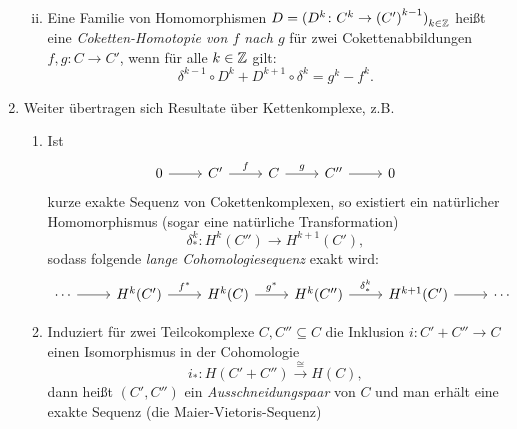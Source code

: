 \begin{kommentar}
\begin{enumerate}
\begin{enumerate}[(i)]
\begin{align*}
          \end{align*}
        \item
          Eine Familie von Homomorphismen $D = {(D^k \colon C^k \to {(C')}^{k-1})}_{k \in \mathbb{Z}}$ heißt eine \emph{Coketten-Homotopie von $f$ nach $g$} für zwei Cokettenabbildungen $f,g \colon C \to C'$, wenn für alle $k \in \mathbb{Z}$ gilt:
          \begin{equation*}
            \delta^{k-1} \circ D^k + D^{k+1} \circ \delta^k = g^k - f^k.
          \end{equation*}
      \end{enumerate}
    \item
      Weiter übertragen sich Resultate über Kettenkomplexe, z.B.\
      \begin{enumerate}
        \item
          Ist
          \begin{equation*}
            \begin{tikzcd}
              0 \arrow{r}{} & C' \arrow{r}{f} & C \arrow{r}{g}  & C'' \arrow{r}{} & 0
            \end{tikzcd}
          \end{equation*}
          kurze exakte Sequenz von Cokettenkomplexen, so existiert ein natürlicher Homomorphismus (sogar eine natürliche Transformation)
          \begin{equation*}
            \delta^k_*\colon H^k(C'') \to H^{k+1}(C'),
          \end{equation*}
          sodass folgende \emph{lange Cohomologiesequenz} exakt wird:
          \begin{equation*}
            \begin{tikzcd}
              \dotsb \arrow{r}{}  & H^k(C') \arrow{r}{f^*}  & H^k(C) \arrow{r}{g^*} & H^k(C'') \arrow{r}{\delta^k_*}  & H^{k+1}(C') \arrow{r}{} & \dotsb
            \end{tikzcd}
          \end{equation*}
        \item
          Induziert für zwei Teilcokomplexe $C,C'' \subseteq C$ die Inklusion $i\colon C' + C'' \to C$ einen Isomorphismus in der Cohomologie
          \begin{equation*}
            i_*\colon H(C' + C'') \overset{\cong}{\longrightarrow} H(C),
          \end{equation*}
          dann heißt $(C',C'')$ ein \emph{Ausschneidungspaar} von $C$ und man erhält eine exakte Sequenz (die Maier-Vietoris-Sequenz)

\end{enumerate}
\end{enumerate}
\end{kommentar}
